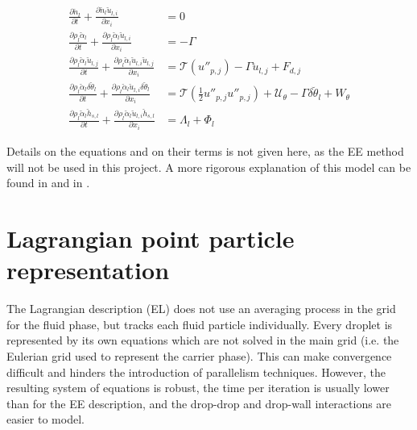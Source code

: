 \begin{subequations}
\label{eq:EE_disperse_phase}
\begin{align}
\frac{\partial \breve{n}_l}{\partial t} + \frac{\partial \breve{n}_l \breve{u}_{l,i}}{\partial x_i} &= 0 \\
\frac{\partial \rho_l \breve{\alpha}_l}{\partial t} + \frac{\partial \rho_l \breve{\alpha}_l \breve{u}_{l,i}}{\partial x_i} &= - \Gamma \\
\frac{\partial \rho_l \breve{\alpha}_l \breve{u}_{l,j}}{\partial t} + \frac{\partial \rho_l \breve{\alpha}_l \breve{u}_{l,i} \breve{u}_{l,j}}{\partial x_i} &= \mathcal{T} \left( u''_{p,j} \right) - \Gamma \breve{u}_{l,j} + F_{d,j} \\
\frac{\partial \rho_l \breve{\alpha}_l \delta \breve{\theta}_l}{\partial t} + \frac{\partial \rho_l \breve{\alpha}_l \breve{u}_{l,i} \delta \breve{\theta}_l }{\partial x_i} &= \mathcal{T} \left( \frac{1}{2} u''_{p,j} u''_{p,j} \right) + \mathcal{U}_\theta - \Gamma \delta \breve{\theta}_l + W_\theta \\
\frac{\partial \rho_l \breve{\alpha}_l \breve{h}_{s,l} }{\partial t} + \frac{\partial \rho_l \breve{\alpha}_l \breve{u}_{l,i} \breve{h}_{s,l} }{\partial x_i} &= \Lambda_l + \Phi_l 
\end{align}
\end{subequations}

Details on the equations and on their terms is not given here, as the EE method will not be used in this project. A more rigorous explanation of this model can be found in  and in .

\section{Lagrangian point particle representation}
\label{sec:ch3_EL_formalisms}


The Lagrangian description (EL) does not use an averaging process in the grid for the fluid phase, but tracks each fluid particle individually. Every droplet is represented by its own equations which are not solved in the main grid (i.e. the Eulerian grid used to represent the carrier phase). This can make convergence difficult and hinders the introduction of parallelism techniques. However, the resulting system of equations is robust, the time per iteration is usually lower than for the EE description, and the drop-drop and drop-wall interactions are easier to model.


